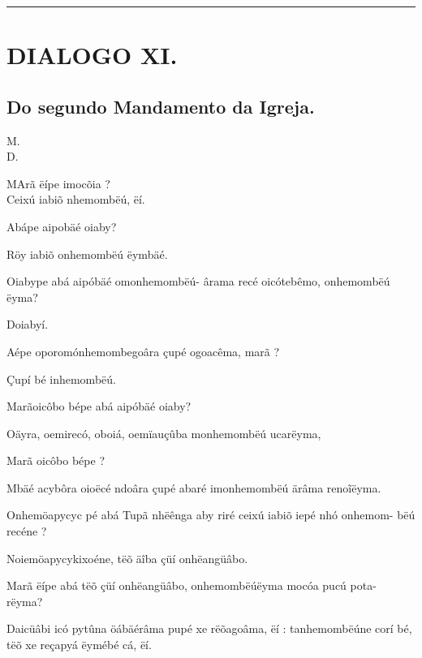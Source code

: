 \documentclass[openany,titlepage,12pt]{book}
\renewcommand{\chaptermark}[1]{\markboth{#1}{}}
\renewcommand{\sectionmark}[1]{\gdef\rightmark{#1}}
\newcommand{\lgS}{\char"017F}
\newcommand{\comecalista}[5]{
    \hspace*{-11.7pt}
    \begin{minipage}[t]{0.08\linewidth}
        \flushright #1\\#2
    \end{minipage}
    \hspace{0pt}
    \begin{minipage}[t]{0.94\linewidth}
        \lettrine
        [findent =2pt, nindent=0pt,  lines=2]
        {#3}{#4}#5
    \end{minipage}
    \vspace*{-3pt}
}
\begin{document}
\vspace{2pt}
\par\noindent\rule{\textwidth}{0.4pt}
\unskip\vspace*{2pt}
\section{DIALOGO XI.}
\unskip\vspace{2pt}
\subsection{Do segundo Mandamento da Igreja.}

\chaptermark{Dialogo XI.}
\sectionmark{Commungar pela Pa\lgS coa.}
\vspace*{-6pt}

\comecalista{M.}{D.}{M}{A}
{rã ëípe imocõia ?\\
Ceixú iabiõ nhemombëú, ëí.
}
\begin{alternate}
    \item Abápe aipobäé oiaby?
    \item Röy iabiõ onhemombëú ëymbäé.
    \item Oiabype abá aipóbäé omonhemombëú-
        ârama recé oicótebêmo, onhemombëú\linebreak
        ëyma?
    \item Doiabyí.
    \item  Aépe oporomónhemombegoâra çupé\linebreak
        ogoacêma, marã ?
    \item Çupí bé inhemombëú.
    \item Marãoicôbo bépe abá aipóbäé oiaby?
    \item Oäyra, oemirecó, oboiá, oemïauçûba\linebreak
        monhemombëú ucarëyma,
    \item Marã oicôbo bépe ?
    \item Mbäé acybôra oioëcé ndoâra çupé abaré
        imonhemombëú ärâma reno\~iëyma.
    \item Onhemöapycyc pé abá Tupã nhëênga\linebreak
        aby riré ceixú iabiõ iepé nhó onhemom-\linebreak
        bëú recéne ?
    \item  Noiemöapycykixoéne, tëõ äîba çüí\linebreak
        onhëangüâbo.
    \item  Marã ëípe abá tëõ çüí onhëangüâbo,\linebreak
        onhemombëúëyma mocóa pucú pota-\linebreak
        rëyma?
    \item Daicüâbi icó pytûna öábäérâma pupé xe
        rëõagoâma, ëí : tanhemombëúne corí bé,
        tëõ xe reçapyá ëymébé cá, ëí.
\end{alternate}
\end{document}
